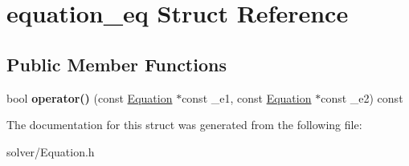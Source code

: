 \hypertarget{structequation__eq}{\section{equation\-\_\-eq \-Struct \-Reference}
\label{structequation__eq}
}
\subsection*{\-Public \-Member \-Functions}
\begin{DoxyCompactItemize}
\item 
\hypertarget{structequation__eq_a12efd07dfa14fef54d83b88d85766d3a}{bool {\bfseries operator()} (const \hyperlink{classEquation}{\-Equation} $\ast$const \-\_\-e1, const \hyperlink{classEquation}{\-Equation} $\ast$const \-\_\-e2) const }\label{structequation__eq_a12efd07dfa14fef54d83b88d85766d3a}

\end{DoxyCompactItemize}


\-The documentation for this struct was generated from the following file\-:\begin{DoxyCompactItemize}
\item 
solver/\-Equation.\-h\end{DoxyCompactItemize}
